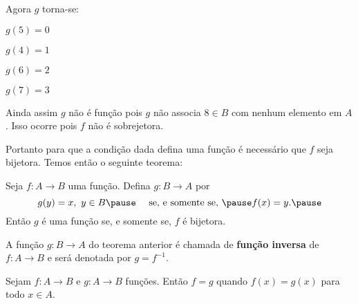 \documentclass{beamer}
\begin{document}
    \begin{frame}
        Agora $g$ torna-se:\pause
        \begin{center}
            $g(5) = 0$\pause\\

            \vspace{.3cm}

            $g(4) = 1$\pause\\

            \vspace{.3cm}

            $g(6) = 2$\\

            \vspace{.3cm}

            $g(7) = 3$\pause
        \end{center}

        Ainda assim $g$ não é função \pause pois $g$ não associa $8 \in B$ \pause com nenhum elemento em $A$.  Isso ocorre pois \pause $f$ não é sobrejetora.\pause

        \vspace{.3cm}

        Portanto para que a condição dada \pause defina uma função \pause é necessário que $f$ seja bijetora. \pause Temos então o seguinte teorema:
    \end{frame}

    \begin{frame}
        \begin{teorema}
            Seja $f: A \to B$ uma função. \pause Defina $g : B \to A$ \pause por\pause
            \[
                g(y) = x,\ y \in B \pause \quad \mbox{ se, e somente se, } \pause f(x) = y.\pause
            \]
            Então $g$ \pause é uma função \pause se, e somente se, \pause $f$ é bijetora.
        \end{teorema}
    \end{frame}

    \begin{frame}
        \begin{definicao}
            A função $g : B \to A$ \pause do teorema anterior \pause é chamada de \textbf{função inversa} \pause de $f : A \to B$ \pause e será denotada por $g = f^{-1}$.\pause
        \end{definicao}

        \vspace{.3cm}

        \begin{definicao}
            Sejam $f : A \to B$ \pause e $g : A \to B$ funções. \pause Então $f = g$ \pause quando $f(x) = g(x)$ \pause para todo $x \in A$.\pause
        \end{definicao}
    \end{frame}
\end{document}
